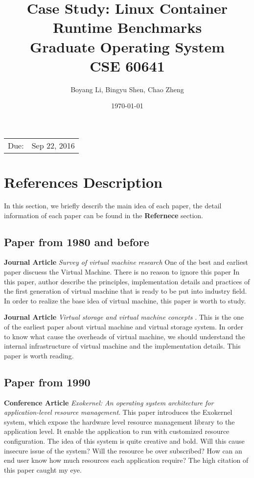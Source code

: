 \documentclass{article}
\title{Case Study: Linux Container Runtime Benchmarks \\ Graduate Operating System \\ CSE 60641} %
\date{\today} %
\author{Boyang Li, Bingyu Shen, Chao Zheng}
\begin{document}
\maketitle %

\begin{center}
\begin{tabular}{l r}
Due: & Sep 22, 2016\\ 
\end{tabular}
\end{center}

\section{References Description}

In this section, we briefly describ the main idea of each paper, the detail information of each
paper can be found in the \textbf{Refernece} section.

\subsection{Paper from 1980 and before}

\textbf{Journal Article} \emph{Survey of virtual machine research}\cite{goldberg1974survey} One
of the best and earliest paper discuess the Virtual Machine. There is no reason to ignore this paper  
In this paper, author describe the principles, implementation details and practices of the first
generation of virtual machine that is ready to be put into industry field. In order to realize the
base idea of virtual machine, this paper is worth to study. 

\medskip

\textbf{Journal Article} \emph{Virtual storage and virtual machine concepts}
\cite{parmelee1972virtual}. This is the one of the earliest paper about virtual machine 
and virtual storage system. In order to know what cause the overheads of virtual machine, we should
understand the internal infrastructure of virtual machine and the implementation details. This paper 
is worth reading.

\subsection{Paper from 1990}

\textbf{Conference Article} \emph{Exokernel: An operating system architecture for application-level 
resource management}\cite{engler1995exokernel}. This paper introduces the Exokernel system, which 
expose the hardware level resource management library to the application level. It enable the 
application to run with customized resource configuration. The idea of this system is quite 
creative and bold. Will this cause insecure issue of the system? Will the resource be over 
subscribed? How can an end user know how much resources each application require? The high 
citation of this paper caught my eye.
\end{document}
